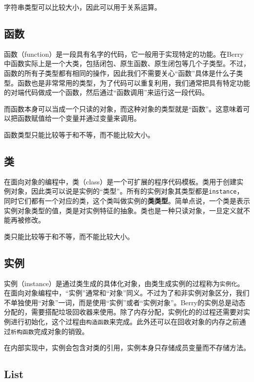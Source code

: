 字符串类型可以比较大小，因此可以用于关系运算。

\subsection{函数}

函数（function）是一段具有名字的代码，它一般用于实现特定的功能。在Berry中函数实际上是一个大类，包括闭包、原生函数、原生闭包等几个子类型。不过，函数的所有子类型都有相同的操作，因此我们不需要关心``函数''具体是什么子类型。函数也是非常常用的类型，为了代码可以重复利用，我们通常把具有特定功能的对端代码做成一个函数，然后通过``函数调用''来运行这一段代码。

而函数本身可以当成一个只读的对象，而这种对象的类型就是``函数''。这意味着可以把函数赋值给一个变量并通过变量来调用。

函数类型只能比较等于和不等，而不能比较大小。

\subsection{类}

在面向对象的编程中，类（class）是一个可扩展的程序代码模板。类用于创建实例对象，因此类可以说是实例的``类型''。所有的实例对象其类型都是\texttt{instance}，同时它们都有一个对应的类，这个类叫做实例的\textbf{类类型}。简单点说，一个类是表示实例对象类型的值，类是对实例特征的抽象。类也是一种只读对象，一旦定义就不能再被修改。

类只能比较等于和不等，而不能比较大小。

\subsection{实例}

实例（instance）是通过类生成的具体化对象，由类生成实例的过程称为\texttt{实例化}。在面向对象编程中，``实例''通常和``对象''同义。不过为了和非实例对象区分，我们不单独使用``对象''一词，而是使用``实例''或者``实例对象''。Berry的实例总是动态分配的，需要搭配垃圾回收器来使用。除了内存分配，实例化的的过程还需要对实例进行初始化，这个过程由\texttt{构造函数}来完成。此外还可以在回收对象的内存之前通过\texttt{析构函数}完成对象的销毁。

在内部实现中，实例会包含对类的引用，实例本身只存储成员变量而不存储方法。

\subsection{List}

